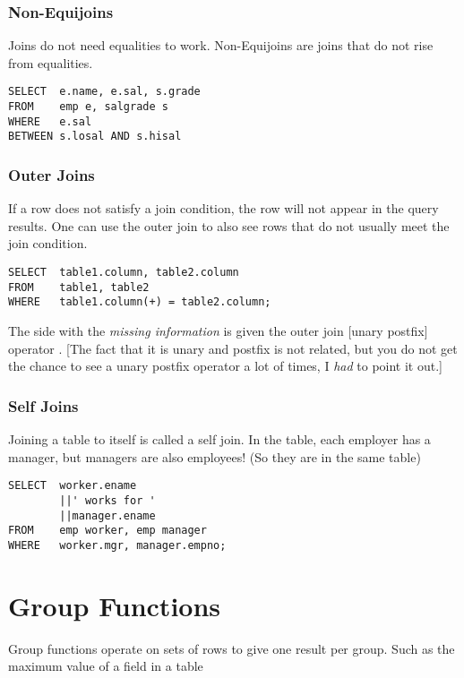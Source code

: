 \documentclass[11pt,a4paper,twocolumn]{book}
\begin{document}
\subsubsection{Non-Equijoins}

Joins do not need equalities to work. Non-Equijoins are joins that do not rise from equalities.

\begin{lstlisting}
SELECT 	e.name, e.sal, s.grade
FROM	emp e, salgrade s
WHERE	e.sal
BETWEEN s.losal AND s.hisal
\end{lstlisting}

\subsubsection{Outer Joins}

If a row does not satisfy a join condition, the row will not appear in the query results. One can use the outer join to also see rows that do not usually meet the join condition.

\begin{lstlisting}
SELECT 	table1.column, table2.column
FROM	table1, table2
WHERE	table1.column(+) = table2.column;
\end{lstlisting}

The side with the \textit{missing information} is given the outer join [unary postfix] operator \C{(+)}. [The fact that it is unary and postfix is not related, but you do not get the chance to see a unary postfix operator a lot of times, I \textit{had} to point it out.]

\subsubsection{Self Joins}

Joining a table to itself is called a self join. In the  table, each employer has a manager, but managers are also employees! (So they are in the same table)

\begin{lstlisting}
SELECT 	worker.ename 
		||' works for '
		||manager.ename
FROM	emp worker, emp manager
WHERE	worker.mgr, manager.empno;
\end{lstlisting}


\section{Group Functions}

Group functions operate on sets of rows to give one result per group. Such as the maximum value of a field in a table\\
\end{document}
